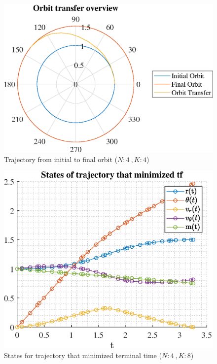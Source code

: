 \documentclass[]{article}
\begin{document}
	\begin{figure}
		\centering
		\includegraphics[scale=0.75]{orbit_N4_K4_C3_tf.eps}
		\caption{Trajectory from initial to final orbit (\(N:4\ , K:4\))}
		\label{fig:orbit_N4_K4_C3_tf}
	\end{figure}
	\begin{figure}
		\centering
		\includegraphics[scale=0.75]{states_N4_K8_C3_tf.eps}
		\caption{States for trajectory that minimized terminal time (\(N:4\ , K:8\))}
		\label{fig:states_N4_K8_C3_tf}
	\end{figure}
\end{document}
